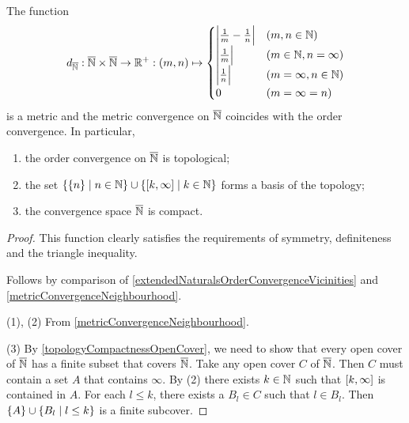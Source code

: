 \begin{lemma} \label{extendedNaturalsTopological}
The function
\[ d_{\overline{\mathbb{N}}}: \overline{\mathbb{N}}\times \overline{\mathbb{N}} \to \mathbb{R}^+: (m,n) \mapsto \begin{cases}
\Big|\frac{1}{m} - \frac{1}{n}\Big| & (m,n\in \mathbb{N}) \\
\Big|\frac{1}{m}\Big| & (m\in \mathbb{N}, n=\infty) \\
\Big|\frac{1}{n}\Big| & (m=\infty, n\in \mathbb{N}) \\
0 & (m= \infty = n)
\end{cases} \]
is a metric and the metric convergence on $\overline{\mathbb{N}}$ coincides with the order convergence. In particular,
\begin{enumerate}
\item the order convergence on $\overline{\mathbb{N}}$ is topological;
\item the set $\setbuilder{\{n\}}{n\in \N} \cup \setbuilder{\interval{k,\infty}}{k\in \N}$ forms a basis of the topology;
\item the convergence space $\overline{\mathbb{N}}$ is compact.
\end{enumerate}
\end{lemma}
\begin{proof}
This function clearly satisfies the requirements of symmetry, definiteness and the triangle inequality.

Follows by comparison of \ref{extendedNaturalsOrderConvergenceVicinities} and \ref{metricConvergenceNeighbourhood}.

(1), (2) From \ref{metricConvergenceNeighbourhood}.

(3) By \ref{topologyCompactnessOpenCover}, we need to show that every open cover of $\overline{\mathbb{N}}$ has a finite subset that covers $\overline{\mathbb{N}}$. Take any open cover $C$ of $\overline{\mathbb{N}}$. Then $C$ must contain a set $A$ that contains $\infty$. By (2) there exists $k\in \mathbb{N}$ such that $\interval{k,\infty}$ is contained in $A$. For each $l\leq k$, there exists a $B_l\in C$ such that $l\in B_l$. Then $\{A\}\cup \setbuilder{B_l}{l\leq k}$ is a finite subcover.
\end{proof}

